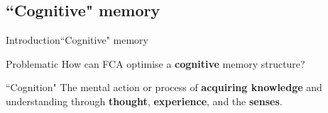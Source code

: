 \subsection{``Cognitive" memory}
\begin{frame}{Introduction}{``Cognitive" memory}


\begin{block}{Problematic}
{
How can FCA  optimise a \textbf{cognitive} memory structure?
}
\end{block}

\vfill

\begin{block}{``Cognition"}
{
  The mental action or process of \textbf{acquiring knowledge} and 
  understanding through \textbf{thought}, \textbf{experience}, and the 
  \textbf{senses}.
}
\vfill
\hspace*{}
\end{block}

\end{frame}

